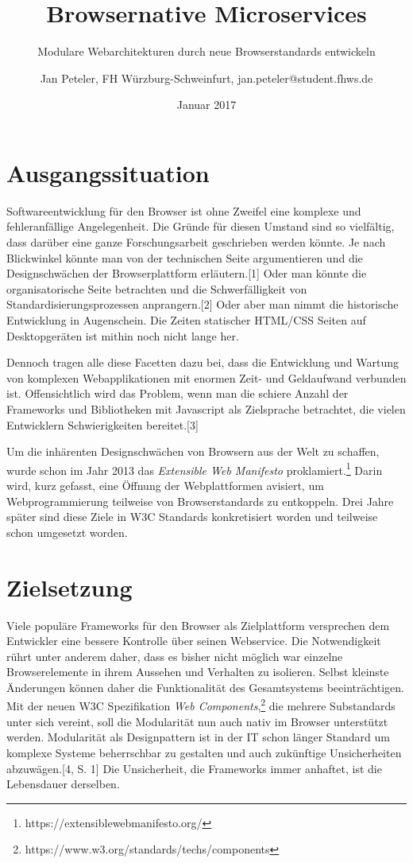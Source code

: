 \documentclass[ngerman,]{assets/latex/ieee}
\title{Browsernative Microservices}
\subtitle{Modulare Webarchitekturen durch neue Browserstandards entwickeln}
\author{Jan Peteler, FH Würzburg-Schweinfurt, jan.peteler@student.fhws.de}
\date{Januar 2017}
\begin{document}
\maketitle

\section{Ausgangssituation}\label{ausgangssituation}

Softwareentwicklung für den Browser ist ohne Zweifel eine komplexe und
fehleranfällige Angelegenheit. Die Gründe für diesen Umstand sind so
vielfältig, dass darüber eine ganze Forschungsarbeit geschrieben werden
könnte. Je nach Blickwinkel könnte man von der technischen Seite
argumentieren und die Designschwächen der Browserplattform
erläutern.{[}1{]} Oder man könnte die organisatorische Seite betrachten
und die Schwerfälligkeit von Standardisierungsprozessen
anprangern.{[}2{]} Oder aber man nimmt die historische Entwicklung in
Augenschein. Die Zeiten statischer HTML/CSS Seiten auf Desktopgeräten
ist mithin noch nicht lange her.

Dennoch tragen alle diese Facetten dazu bei, dass die Entwicklung und
Wartung von komplexen Webapplikationen mit enormen Zeit- und Geldaufwand
verbunden ist. Offensichtlich wird das Problem, wenn man die schiere
Anzahl der Frameworks und Bibliotheken mit Javascript als Zielsprache
betrachtet, die vielen Entwicklern Schwierigkeiten bereitet.{[}3{]}

Um die inhärenten Designschwächen von Browsern aus der Welt zu schaffen,
wurde schon im Jahr 2013 das \emph{Extensible Web Manifesto}
proklamiert.\footnote{https://extensiblewebmanifesto.org/} Darin wird,
kurz gefasst, eine Öffnung der Webplattformen avisiert, um
Webprogrammierung teilweise von Browserstandards zu entkoppeln. Drei
Jahre später sind diese Ziele in W3C Standards konkretisiert worden und
teilweise schon umgesetzt worden.

\section{Zielsetzung}\label{zielsetzung}

Viele populäre Frameworks für den Browser als Zielplattform versprechen
dem Entwickler eine bessere Kontrolle über seinen Webservice. Die
Notwendigkeit rührt unter anderem daher, dass es bisher nicht möglich
war einzelne Browserelemente in ihrem Aussehen und Verhalten zu
isolieren. Selbst kleinste Änderungen können daher die Funktionalität
des Gesamtsystems beeinträchtigen. Mit der neuen W3C Spezifikation
\emph{Web Components},\footnote{https://www.w3.org/standards/techs/components}
die mehrere Substandards unter sich vereint, soll die Modularität nun
auch nativ im Browser unterstützt werden. Modularität als Designpattern
ist in der IT schon länger Standard um komplexe Systeme beherrschbar zu
gestalten und auch zukünftige Unsicherheiten abzuwägen.{[}4, S. 1{]} Die
Unsicherheit, die Frameworks immer anhaftet, ist die Lebensdauer
derselben.
\end{document}
